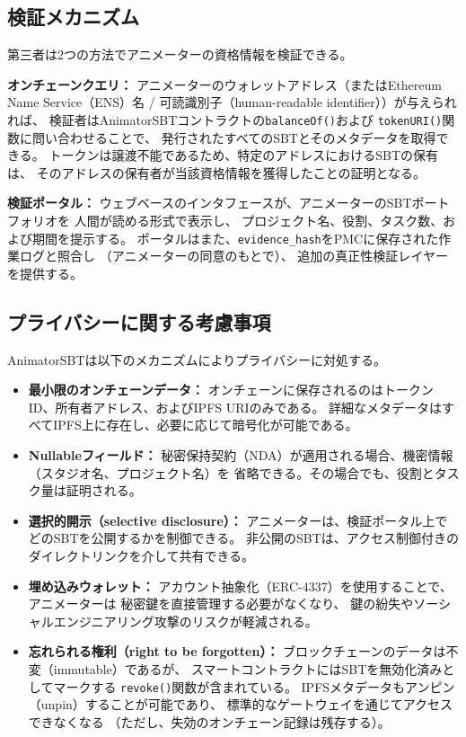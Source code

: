 \subsection{検証メカニズム}
\label{subsec:verification}

第三者は2つの方法でアニメーターの資格情報を検証できる。

\textbf{オンチェーンクエリ：}
アニメーターのウォレットアドレス（またはEthereum Name Service（ENS）名 /
可読識別子（human-readable identifier））が与えられれば、
検証者はAnimatorSBTコントラクトの\texttt{balanceOf()}および
\texttt{tokenURI()}関数に問い合わせることで、
発行されたすべてのSBTとそのメタデータを取得できる。
トークンは譲渡不能であるため、特定のアドレスにおけるSBTの保有は、
そのアドレスの保有者が当該資格情報を獲得したことの証明となる。

\textbf{検証ポータル：}
ウェブベースのインタフェースが、アニメーターのSBTポートフォリオを
人間が読める形式で表示し、
プロジェクト名、役割、タスク数、および期間を提示する。
ポータルはまた、\texttt{evidence\_hash}をPMCに保存された作業ログと照合し
（アニメーターの同意のもとで）、
追加の真正性検証レイヤーを提供する。

\subsection{プライバシーに関する考慮事項}
\label{subsec:privacy}

AnimatorSBTは以下のメカニズムによりプライバシーに対処する。

\begin{itemize}
  \item \textbf{最小限のオンチェーンデータ：}
    オンチェーンに保存されるのはトークンID、所有者アドレス、およびIPFS URIのみである。
    詳細なメタデータはすべてIPFS上に存在し、必要に応じて暗号化が可能である。
  \item \textbf{Nullableフィールド：}
    秘密保持契約（NDA）が適用される場合、機密情報（スタジオ名、プロジェクト名）を
    省略できる。その場合でも、役割とタスク量は証明される。
  \item \textbf{選択的開示（selective disclosure）：}
    アニメーターは、検証ポータル上でどのSBTを公開するかを制御できる。
    非公開のSBTは、アクセス制御付きのダイレクトリンクを介して共有できる。
  \item \textbf{埋め込みウォレット：}
    アカウント抽象化（ERC-4337）を使用することで、アニメーターは
    秘密鍵を直接管理する必要がなくなり、
    鍵の紛失やソーシャルエンジニアリング攻撃のリスクが軽減される。
  \item \textbf{忘れられる権利（right to be forgotten）：}
    ブロックチェーンのデータは不変（immutable）であるが、
    スマートコントラクトにはSBTを無効化済みとしてマークする
    \texttt{revoke()}関数が含まれている。
    IPFSメタデータもアンピン（unpin）することが可能であり、
    標準的なゲートウェイを通じてアクセスできなくなる
    （ただし、失効のオンチェーン記録は残存する）。
\end{itemize}
